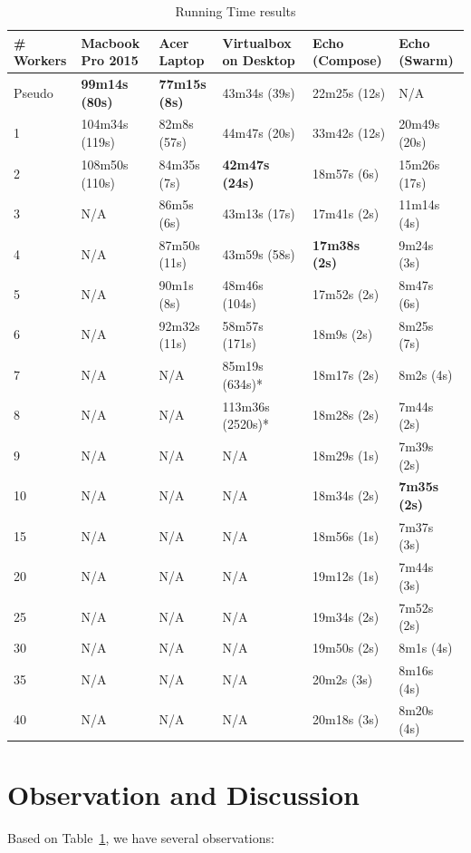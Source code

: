 \begin{table}[hbt]
\centering
\caption{Running Time results}\label{t:results-table}
	\begin{tabular}{llllll}
		\toprule
		\# Workers & Macbook Pro 2015 & Acer Laptop & Virtualbox on 
		Desktop & Echo (Compose) & Echo (Swarm) \\ \midrule
		Pseudo & \textbf{99m14s (80s)} & \textbf{77m15s (8s)} & 43m34s 
		(39s) & 22m25s (12s) & N/A \\\midrule
		1 & 104m34s (119s) & 82m8s (57s) & 44m47s (20s) & 33m42s (12s) & 
		20m49s (20s) \\\midrule
		2 & 108m50s (110s) & 84m35s (7s) & \textbf{42m47s (24s)} & 18m57s 
		(6s) & 15m26s (17s) \\\midrule
		3 & N/A & 86m5s (6s) & 43m13s (17s) & 17m41s (2s) & 11m14s (4s) 
		\\\midrule
		4 & N/A & 87m50s (11s) & 43m59s (58s) & \textbf{17m38s (2s)} & 
		9m24s (3s) \\\midrule
		5 & N/A & 90m1s (8s) & 48m46s (104s) & 17m52s (2s) & 8m47s (6s) 
		\\\midrule
		6 & N/A & 92m32s (11s) & 58m57s (171s) & 18m9s (2s) & 8m25s (7s) 
		\\\midrule
		7 & N/A & N/A & 85m19s (634s)* & 18m17s (2s) & 8m2s (4s) \\\midrule
		8 & N/A & N/A & 113m36s (2520s)* & 18m28s (2s) & 7m44s (2s) 
		\\\midrule
		9 & N/A & N/A & N/A & 18m29s (1s) & 7m39s (2s) \\\midrule
		10 & N/A & N/A & N/A & 18m34s (2s) & \textbf{7m35s (2s)} \\\midrule
		15 & N/A & N/A & N/A & 18m56s (1s) & 7m37s (3s) \\\midrule
		20 & N/A & N/A & N/A & 19m12s (1s) & 7m44s (3s) \\\midrule
		25 & N/A & N/A & N/A & 19m34s (2s) & 7m52s (2s) \\\midrule
		30 & N/A & N/A & N/A & 19m50s (2s) & 8m1s (4s) \\\midrule
		35 & N/A & N/A & N/A & 20m2s (3s) & 8m16s (4s) \\\midrule
		40 & N/A & N/A & N/A & 20m18s (3s) & 8m20s (4s)\\\bottomrule
	\end{tabular}
\end{table}

\section{Observation and Discussion}
Based on Table~\ref{t:results-table}, we have several observations: 

